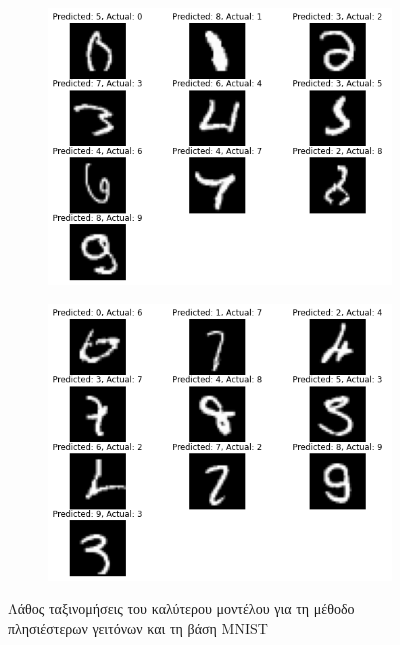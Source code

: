 \documentclass[a4paper]{article}
\begin{document}
\begin{figure}[H]
    \centering

    \begin{subfigure}[t]{0.48\linewidth}
    \includegraphics[width=\linewidth]{mnist/wrong_results_knn_1.png}
    \end{subfigure}
    \begin{subfigure}[t]{0.48\linewidth}
    \includegraphics[width=\linewidth]{mnist/wrong_results_knn_2.png}
    \end{subfigure}

    \caption{Λάθος ταξινομήσεις του καλύτερου μοντέλου για τη μέθοδο
    πλησιέστερων γειτόνων και τη βάση MNIST}
    \label{fig:mnist_wrong_knn}
\end{figure}
\end{document}
